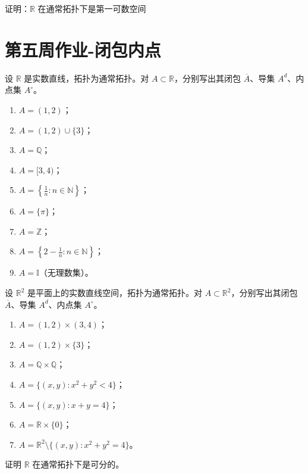 \begin{homework}
[5] 
证明：$\mathbb{R}$ 在通常拓扑下是第一可数空间
\end{homework}


\section{第五周作业-闭包内点}

\begin{homework}[6]
设 $\mathbb{R}$ 是实数直线，拓扑为通常拓扑。对 $A \subset \mathbb{R}$，分别写出其闭包 $\overline{A}$、导集 $A^d$、内点集 $A^\circ$。

\begin{enumerate}[(1)]
  \item $A = (1,2)$；
  \item $A = (1,2)\cup\{3\}$；
  \item $A = \mathbb{Q}$；
  \item $A = [3,4)$；
  \item $A = \left\{\tfrac{1}{n} : n\in\mathbb{N}\right\}$；
  \item $A = \{\pi\}$；
  \item $A = \mathbb{Z}$；
  \item $A = \left\{2 - \tfrac{1}{n} : n\in\mathbb{N}\right\}$；
  \item $A = \mathbb{I}$（无理数集）。
\end{enumerate}
\end{homework}

\begin{homework}[7]
设 $\mathbb{R}^2$ 是平面上的实数直线空间，拓扑为通常拓扑。对 $A \subset \mathbb{R}^2$，分别写出其闭包 $\overline{A}$、导集 $A^d$、内点集 $A^\circ$。

\begin{enumerate}[(1)]
  \item $A = (1,2)\times(3,4)$；
  \item $A = (1,2)\times\{3\}$；
  \item $A = \mathbb{Q}\times\mathbb{Q}$；
  \item $A = \{(x,y): x^{2}+y^{2}<4\}$；
  \item $A = \{(x,y): x+y=4\}$；
  \item $A = \mathbb{R}\times\{0\}$；
  \item $A = \mathbb{R}^{2}\setminus\{(x,y):x^{2}+y^{2}=4\}$。
\end{enumerate}
\end{homework}

\begin{homework}[14]
证明 $\mathbb{R}$ 在通常拓扑下是可分的。
\end{homework}
